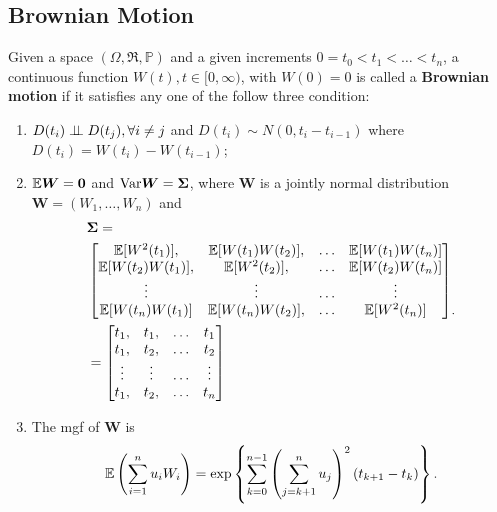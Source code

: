 \subsection{Brownian Motion}
\begin{definition}\label{Definition:Brownian_motion}
Given a space $(\Omega,\mathfrak{R},\mathbb{P})$ and a given increments $0=t_0<t_1<\dots<t_n$, a continuous function $W(t),t\in[0,\infty)$, with $W(0)=0$ is called a \textbf{Brownian motion} if it satisfies any one of the follow three condition:
\begin{enumerate}
\item $D(t_i)\perp\!\!\!\perp D(t_j),\forall i\ne j$ and $D(t_i)\sim N(0,t_i-t_{i-1})$ where $D(t_i)=W(t_i)-W(t_{i-1})$;
\item $\mathbb{E} \boldsymbol{W} = \boldsymbol{0}$ and $\text{Var} \boldsymbol{W}=\boldsymbol{\Sigma}$, where $\boldsymbol{W}$ is a jointly normal distribution $\boldsymbol{W}=(W_1,\dots,W_n)$ and
\begin{equation}
\begin{aligned}
&\boldsymbol{\Sigma}=\\
&\begin{bmatrix}
\mathbb{E} [W^2(t_1)], & \mathbb{E}[W(t_1)W(t_2)],&\dots &\mathbb{E}[W(t_1)W(t_n)]\\
\mathbb{E}[W(t_2)W(t_1)], &\mathbb{E} [W^2(t_2)], &\dots&\mathbb{E}[W(t_2)W(t_n)]\\
\vdots &\vdots &\dots & \vdots\\
\mathbb{E} [W(t_n)W(t_1)] &\mathbb{E}[W(t_n)W(t_2)], &\dots & \mathbb{E}[W^2(t_n)]
\end{bmatrix}\\
&=
\begin{bmatrix}
t_1, & t_1, &\dots & t_1\\
t_1, & t_2, &\dots & t_2\\
\vdots & \vdots & \dots & \vdots\\
t_1, & t_2, &\dots & t_n
\end{bmatrix}
\label{eq:brownian_cov_matrix}
\end{aligned}.
\end{equation}
\item The mgf of $\boldsymbol{W}$ is
\begin{equation}
\mathbb{E} \left(\sum_{i=1}^nu_iW_i\right)=\exp\left\{\sum_{k=0}^{n-1}\left(\sum_{j=k+1}^nu_j\right)^2(t_{k+1}-t_{k})\right\}.
\end{equation}
\end{enumerate}
\end{definition}

